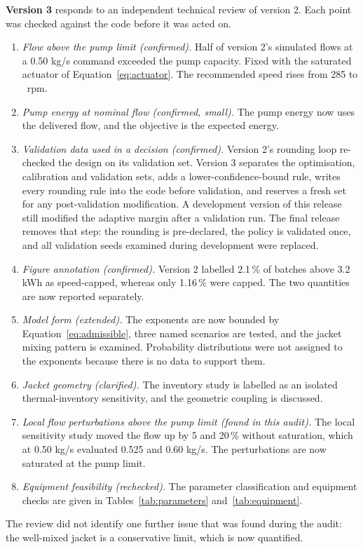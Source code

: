 \documentclass[11pt,letterpaper]{article}
\begin{document}
\textbf{Version 3} responds to an independent technical review of version 2. Each point was checked against the code before it was acted on.
\begin{enumerate}[leftmargin=*]
\item \emph{Flow above the pump limit (confirmed).} Half of version 2's simulated flows at a 0.50 kg/s command exceeded the pump capacity. Fixed with the saturated actuator of Equation~\ref{eq:actuator}. The recommended speed rises from 285 to \vRecRpm\ rpm.
\item \emph{Pump energy at nominal flow (confirmed, small).} The pump energy now uses the delivered flow, and the objective is the expected energy.
\item \emph{Validation data used in a decision (confirmed).} Version 2's rounding loop re-checked the design on its validation set. Version 3 separates the optimisation, calibration and validation sets, adds a lower-confidence-bound rule, writes every rounding rule into the code before validation, and reserves a fresh set for any post-validation modification. A development version of this release still modified the adaptive margin after a validation run. The final release removes that step: the rounding is pre-declared, the policy is validated once, and all validation seeds examined during development were replaced.
\item \emph{Figure annotation (confirmed).} Version 2 labelled 2.1\,\% of batches above 3.2 kWh as speed-capped, whereas only 1.16\,\% were capped. The two quantities are now reported separately.
\item \emph{Model form (extended).} The exponents are now bounded by Equation~\ref{eq:admissible}, three named scenarios are tested, and the jacket mixing pattern is examined. Probability distributions were not assigned to the exponents because there is no data to support them.
\item \emph{Jacket geometry (clarified).} The inventory study is labelled as an isolated thermal-inventory sensitivity, and the geometric coupling is discussed.
\item \emph{Local flow perturbations above the pump limit (found in this audit).} The local sensitivity study moved the flow up by 5 and 20\,\% without saturation, which at 0.50 kg/s evaluated 0.525 and 0.60 kg/s. The perturbations are now saturated at the pump limit.
\item \emph{Equipment feasibility (rechecked).} The parameter classification and equipment checks are given in Tables~\ref{tab:parameters} and~\ref{tab:equipment}.
\end{enumerate}
The review did not identify one further issue that was found during the audit: the well-mixed jacket is a conservative limit, which is now quantified.
\end{document}
